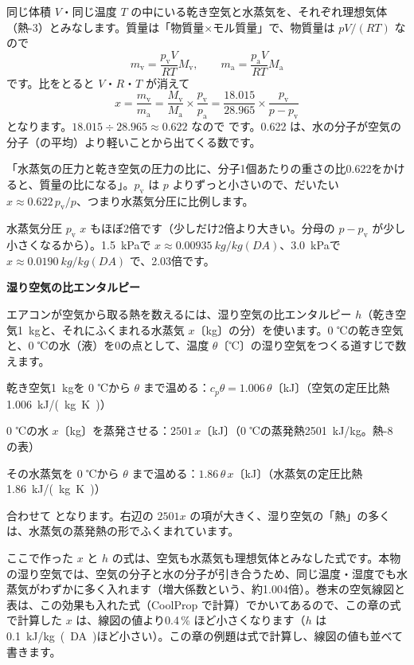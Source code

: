同じ体積 $V$・同じ温度 $T$ の中にいる乾き空気と水蒸気を、それぞれ理想気体（熱-3）とみなします。質量は「物質量×モル質量」で、物質量は $pV/(RT)$ なので
\[ m_{\mathrm v}=\frac{p_{\mathrm v}V}{RT}M_{\mathrm v},\qquad m_{\mathrm a}=\frac{p_{\mathrm a}V}{RT}M_{\mathrm a} \]
です。比をとると $V$・$R$・$T$ が消えて
\[ x=\frac{m_{\mathrm v}}{m_{\mathrm a}}=\frac{M_{\mathrm v}}{M_{\mathrm a}}\times\frac{p_{\mathrm v}}{p_{\mathrm a}}=\frac{18.015}{28.965}\times\frac{p_{\mathrm v}}{p-p_{\mathrm v}} \]
となります。$18.015\div28.965\approx0.622$ なので
です。\label{ph:熱-9:x}0.622 は、水の分子が空気の分子（の平均）より軽いことから出てくる数です。
\begin{phyomi}[$x=0.622\,p_{\mathrm v}/(p-p_{\mathrm v})$]
「水蒸気の圧力と乾き空気の圧力の比に、分子1個あたりの重さの比0.622をかけると、質量の比になる」。$p_{\mathrm v}$ は $p$ よりずっと小さいので、だいたい $x\approx0.622\,p_{\mathrm v}/p$、つまり水蒸気分圧に比例します。
\end{phyomi}
\begin{phbaisuru}{水蒸気分圧 $p_{\mathrm v}$}
$x$ もほぼ2倍です（少しだけ2倍より大きい。分母の $p-p_{\mathrm v}$ が少し小さくなるから）。\qty{1.5}{kPa}で $x\approx\qty{0.00935}{kg/kg(DA)}$、\qty{3.0}{kPa}で $x\approx\qty{0.0190}{kg/kg(DA)}$ で、2.03倍です。
\end{phbaisuru}

\noindent\textbf{湿り空気の比エンタルピー}\par\nobreak
エアコンが空気から取る熱を数えるには、湿り空気の比エンタルピー $h$（乾き空気\qty{1}{kg}と、それにふくまれる水蒸気 $x$〔kg〕の分）を使います。0 ℃の乾き空気と、0 ℃の水（液）を0の点として、温度 $\theta$〔℃〕の湿り空気をつくる道すじで数えます。
\begin{enumerate}[label={\bkcircled[bkBlue]{\arabic*}}, leftmargin=2.4\zw, itemsep=2pt, topsep=2pt]
\item 乾き空気\qty{1}{kg}を 0 ℃から $\theta$ まで温める：$c_p\theta=1.006\,\theta$〔kJ〕（空気の定圧比熱 \qty{1.006}{kJ/(kg.K)}）
\item 0 ℃の水 $x$〔kg〕を蒸発させる：$2501\,x$〔kJ〕（0 ℃の蒸発熱\qty{2501}{kJ/kg}。熱-8 の表）
\item その水蒸気を 0 ℃から $\theta$ まで温める：$1.86\,\theta\,x$〔kJ〕（水蒸気の定圧比熱 \qty{1.86}{kJ/(kg.K)}）
\end{enumerate}
合わせて
となります。\label{ph:熱-9:h}右辺の $2501x$ の項が大きく、湿り空気の「熱」の多くは、水蒸気の蒸発熱の形でふくまれています。
\begin{seikaku}
ここで作った $x$ と $h$ の式は、空気も水蒸気も理想気体とみなした式です。本物の湿り空気では、空気の分子と水の分子が引き合うため、同じ温度・湿度でも水蒸気がわずかに多く入れます（増大係数という、約1.004倍）。巻末の空気線図と表は、この効果も入れた式（CoolProp で計算）でかいてあるので、この章の式で計算した $x$ は、線図の値より0.4\,\% ほど小さくなります（$h$ は\qty{0.1}{kJ/kg(DA)}ほど小さい）。この章の例題は式で計算し、線図の値も並べて書きます。
\end{seikaku}

